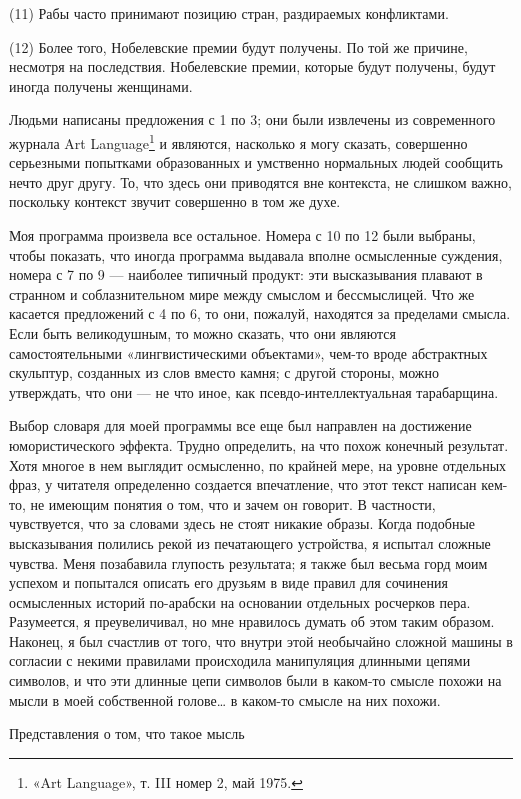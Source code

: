 (11) Рабы часто принимают позицию стран, раздираемых конфликтами.

(12) Более того, Нобелевские премии будут получены. По той же причине, несмотря на последствия. Нобелевские премии, которые будут получены, будут иногда получены женщинами.

Людьми написаны предложения с 1 по 3; они были извлечены из современного журнала Art Language\footnote{«Art Language», т. III номер 2, май 1975.} и являются, насколько я могу сказать, совершенно серьезными попытками образованных и умственно нормальных людей сообщить нечто друг другу. То, что здесь они приводятся вне контекста, не слишком важно, поскольку контекст звучит совершенно в том же духе.

Моя программа произвела все остальное. Номера с 10 по 12 были выбраны, чтобы показать, что иногда программа выдавала вполне осмысленные суждения, номера с 7 по 9 --- наиболее типичный продукт: эти высказывания плавают в странном и соблазнительном мире между смыслом и бессмыслицей. Что же касается предложений с 4 по 6, то они, пожалуй, находятся за пределами смысла. Если быть великодушным, то можно сказать, что они являются самостоятельными «лингвистическими объектами», чем-то вроде абстрактных скульптур, созданных из слов вместо камня; с другой стороны, можно утверждать, что они --- не что иное, как псевдо-интеллектуальная тарабарщина.

Выбор словаря для моей программы все еще был направлен на достижение юмористического эффекта. Трудно определить, на что похож конечный результат. Хотя многое в нем выглядит осмысленно, по крайней мере, на уровне отдельных фраз, у читателя определенно создается впечатление, что этот текст написан кем-то, не имеющим понятия о том, что и зачем он говорит. В частности, чувствуется, что за словами здесь не стоят никакие образы. Когда подобные высказывания полились рекой из печатающего устройства, я испытал сложные чувства. Меня позабавила глупость результата; я также был весьма горд моим успехом и попытался описать его друзьям в виде правил для сочинения осмысленных историй по-арабски на основании отдельных росчерков пера. Разумеется, я преувеличивал, но мне нравилось думать об этом таким образом. Наконец, я был счастлив от того, что внутри этой необычайно сложной машины в согласии с некими правилами происходила манипуляция длинными цепями символов, и что эти длинные цепи символов были в каком-то смысле похожи на мысли в моей собственной голове\ldots{} в каком-то смысле на них похожи.

Представления о том, что такое мысль

